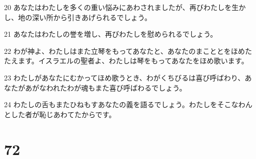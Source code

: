 \par 20 あなたはわたしを多くの重い悩みにあわされましたが、再びわたしを生かし、地の深い所から引きあげられるでしょう。
\par 21 あなたはわたしの誉を増し、再びわたしを慰められるでしょう。
\par 22 わが神よ、わたしはまた立琴をもってあなたと、あなたのまこととをほめたたえます。イスラエルの聖者よ、わたしは琴をもってあなたをほめ歌います。
\par 23 わたしがあなたにむかってほめ歌うとき、わがくちびるは喜び呼ばわり、あなたがあがなわれたわが魂もまた喜び呼ばわるでしょう。
\par 24 わたしの舌もまたひねもすあなたの義を語るでしょう。わたしをそこなわんとした者が恥じあわてたからです。

\chapter{72}

